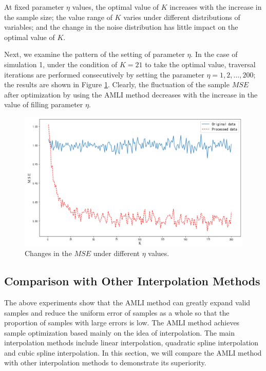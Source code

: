 \documentclass[mathematics,article,accept,pdftex,moreauthors]{Definitions/mdpi}
\begin{document}
At fixed parameter $\eta$ values, the optimal value of $K$ increases with the increase in the sample size; the value range of $K$ varies under different distributions of variables; and the change in the noise distribution has little impact on the optimal value of $K$. 

Next, we examine the pattern of the setting of parameter $\eta$. In the case of simulation 1, under the condition of $K = 21$ to take the optimal value, traversal iterations are performed consecutively by setting the parameter $\eta = 1, 2,\ldots, 200$; the results are shown in Figure \ref{fig:3-}. Clearly, the fluctuation of the sample $MSE$ after optimization by using the AMLI method decreases with the increase in the value of filling parameter $\eta$.


\begin{figure}[H]
	\includegraphics[width=1\linewidth]{"Figures/第二篇论文图/图3 参数不同取值下MSE变化趋势"}
	\renewcommand{\figurename}{Figure}
	\caption{Changes in the $MSE$ under different $\eta$ values.}
	\label{fig:3-}
\end{figure}

\subsection{Comparison with Other Interpolation Methods}
The above experiments show that the AMLI method can greatly expand valid samples and reduce the uniform error of samples as a whole so that the proportion of samples with large errors is low. The AMLI method achieves sample optimization based mainly on the idea of interpolation. The main interpolation methods include linear interpolation, quadratic spline interpolation and cubic spline interpolation. In this section, we will compare the AMLI method with other interpolation methods to demonstrate its superiority.
\end{document}

